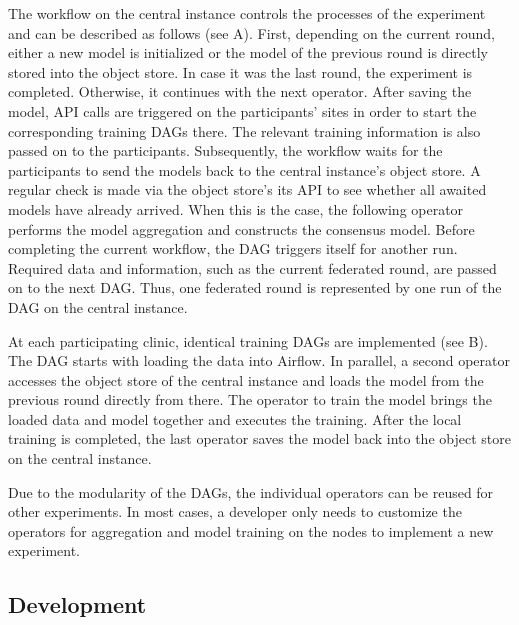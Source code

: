 The workflow on the central instance controls the processes of the experiment and can be described as follows (see  A).
First, depending on the current round, either a new model is initialized  or the model of the previous round is directly stored into the object store.
In case it was the last round, the experiment is completed. Otherwise, it continues with the next operator.
After saving the model, API calls are triggered on the participants' sites in order to start the corresponding training DAGs there. The relevant training information is also passed on to the participants. Subsequently, the workflow waits for the participants to send the models back to the central instance's object store. A regular check is made via the object store's its API to see whether all awaited models have already arrived.
When this is the case, the following operator performs the model aggregation and constructs the consensus model.
Before completing the current workflow, the DAG triggers itself for another run. Required data and information, such as the current federated round, are passed on to the next DAG. Thus, one federated round is represented by one run of the DAG on the central instance.

At each participating clinic, identical training DAGs are implemented (see  B).
The DAG starts with loading the data into Airflow. In parallel, a second operator accesses the object store of the central instance and loads the model from the previous round directly from there.
The operator to train the model brings the loaded data and model together and executes the training. After the local training is completed, the last operator saves the model back into the object store on the central instance.

Due to the modularity of the DAGs, the individual operators can be reused for other experiments. In most cases, a developer only needs to customize the operators for aggregation and model training on the nodes to implement a new experiment.


\subsection{Development}
\label{subsec:Development} 

